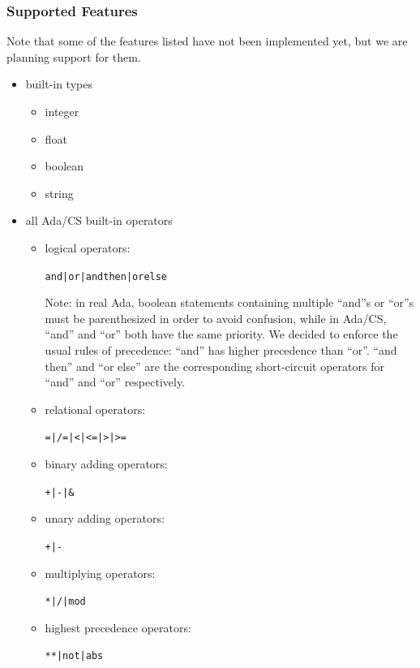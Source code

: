 \documentclass[onecolumn,11pt]{article}
\begin{document}
\subsubsection{Supported Features}

Note that some of the features listed have not been implemented yet, but we are planning support for them.

\begin{itemize}
\item{
  built-in types 
  \begin{itemize}
    \item{integer}
    \item{float}
    \item{boolean}
    \item{string}
  \end{itemize}
}

\item{
  all Ada/CS built-in operators
  \begin{itemize}
    \item{
      logical operators: \begin{alltt} and | or | and then | or else \end{alltt}
      Note: in real Ada, boolean statements containing multiple ``and''s or ``or''s must be parenthesized in order to avoid confusion, while in Ada/CS, ``and'' and ``or'' both have the same priority. We decided to enforce the usual rules of precedence: ``and'' has higher precedence than ``or''. ``and then'' and ``or else'' are the corresponding short-circuit operators for ``and'' and ``or'' respectively.
    }
    \item{relational operators: \begin{alltt} = | /= | < | <= | > | >= \end{alltt}}
    \item{binary adding operators: \begin{alltt} + | - | & \end{alltt}}
    \item{unary adding operators: \begin{alltt} + | - \end{alltt}}
    \item{multiplying operators: \begin{alltt} * | / | mod \end{alltt}}
    \item{highest precedence operators: \begin{alltt} ** | not | abs \end{alltt}}
  \end{itemize}
}


\end{itemize}
\end{document}
